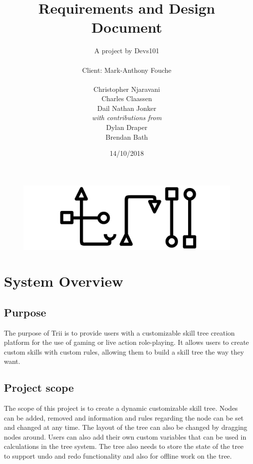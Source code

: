 \documentclass[12pt]{article}
\title{Requirements and Design Document}
\author{A project by Devs101\\ \\
  Client: Mark-Anthony Fouche\\ \\
  Christopher Njaravani\\
  Charles Claassen\\
  Dail Nathan Jonker\\
  \textit{with contributions from}\\
  Dylan Draper\\
  Brendan Bath\\
  }
\date{14/10/2018}
\begin{document}
  \maketitle
  \begin{figure}[H]
    \includegraphics[width=\linewidth]{images/logo.jpg}
    \label{fig:logo}
  \end{figure}
  \newpage
  
  \tableofcontents
  \newpage
  
  \section{System Overview}
  
    \subsection{Purpose}
    The purpose of Trii is to provide users with a customizable skill tree creation platform for the use of gaming or live action role-playing. It allows users to create custom skills with custom rules, allowing them to build a skill tree the way they want.
    
    \subsection{Project scope}
    The scope of this project is to create a dynamic customizable skill tree. Nodes can be added, removed and information and rules regarding the node can be set and changed at any time.\newline 
    The layout of the tree can also be changed by dragging nodes around.\newline 
    Users can also add their own custom variables that can be used in calculations in the tree system.\newline 
    The tree also needs to store the state of the tree to support undo and redo functionality and also for offline work on the tree.
\end{document}
